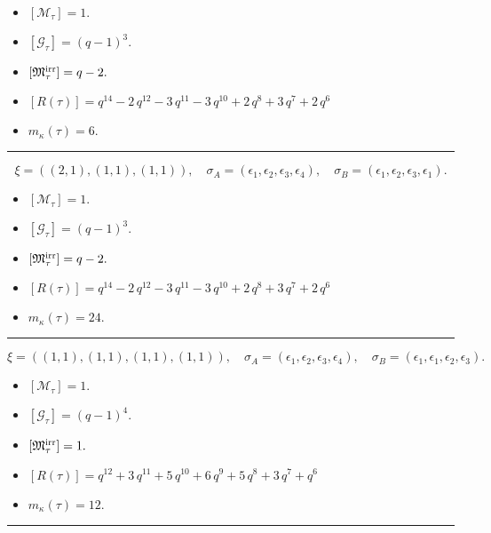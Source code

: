\documentclass[10pt,a4paper]{amsart}
\begin{document}
\begin{itemize}
 \item $[\mathcal{M}_{\tau}] = 1 .$

 \item $[\mathcal{G}_{\tau}] = {\left(q - 1\right)}^{3} .$

 \item $[{\frak M}_{\tau}^{\textrm{irr}}] = q - 2 .$

 \item $[R(\tau)] = q^{14} - 2 \, q^{12} - 3 \, q^{11} - 3 \, q^{10} + 2 \, q^{8} + 3 \, q^{7} + 2 \, q^{6} $

 \item $m_{\kappa}(\tau) = 6 .$

 \end{itemize}
\noindent\rule{8cm}{0.4pt}

$$\xi = ({(2, 1), (1, 1), (1, 1)}),\quad \sigma_A = ({{\epsilon_1, \epsilon_2}, {\epsilon_3}, {\epsilon_4}}),\quad \sigma_B = ({{\epsilon_1, \epsilon_2}, {\epsilon_3}, {\epsilon_1}}).$$

\begin{itemize}
 \item $[\mathcal{M}_{\tau}] = 1 .$

 \item $[\mathcal{G}_{\tau}] = {\left(q - 1\right)}^{3} .$

 \item $[{\frak M}_{\tau}^{\textrm{irr}}] = q - 2 .$

 \item $[R(\tau)] = q^{14} - 2 \, q^{12} - 3 \, q^{11} - 3 \, q^{10} + 2 \, q^{8} + 3 \, q^{7} + 2 \, q^{6} $

 \item $m_{\kappa}(\tau) = 24 .$

 \end{itemize}
\noindent\rule{8cm}{0.4pt}

$$\xi = ({(1, 1), (1, 1), (1, 1), (1, 1)}),\quad \sigma_A = ({{\epsilon_1}, {\epsilon_2}, {\epsilon_3}, {\epsilon_4}}),\quad \sigma_B = ({{\epsilon_1}, {\epsilon_1}, {\epsilon_2}, {\epsilon_3}}).$$

\begin{itemize}
 \item $[\mathcal{M}_{\tau}] = 1 .$

 \item $[\mathcal{G}_{\tau}] = {\left(q - 1\right)}^{4} .$

 \item $[{\frak M}_{\tau}^{\textrm{irr}}] = 1 .$

 \item $[R(\tau)] = q^{12} + 3 \, q^{11} + 5 \, q^{10} + 6 \, q^{9} + 5 \, q^{8} + 3 \, q^{7} + q^{6} $

 \item $m_{\kappa}(\tau) = 12 .$

 \end{itemize}
\noindent\rule{8cm}{0.4pt}
\end{document}
